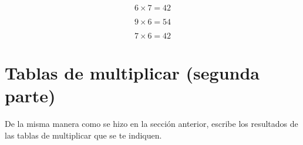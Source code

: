 \documentclass[11pt]{article}
\begin{document}
\begin{center}
\begin{multicols}{5}
\begin{equation} 6 \times 7 = 42 \end{equation}

\begin{equation} 9 \times 6 = 54 \end{equation}

\begin{equation} 7 \times 6 = 42 \end{equation}

\end{multicols}
\end{center}

\setcounter{equation}{0} 

\section{Tablas de multiplicar {\normalsize(segunda parte)}}
De la misma manera como se hizo en la secci\'on anterior, escribe los
resultados de las tablas de multiplicar que se te indiquen.
\end{document}
